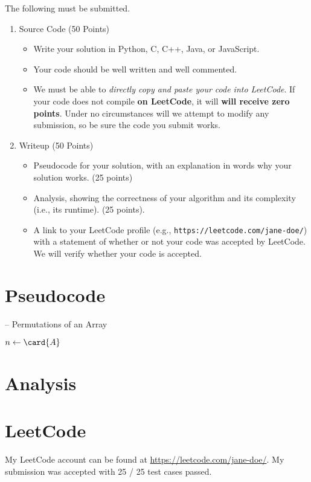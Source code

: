 \documentclass[draft]{article}
\begin{document}
\begin{titlepage}
    The following must be submitted.
    \begin{enumerate}[label=\textbf{(\alph*)}]
        \item Source Code (50 Points)
              \begin{itemize}
                  \item Write your solution in Python, C, C++, Java, or JavaScript.
                  \item Your code should be well written and well commented.
                  \item We must be able to \emph{directly copy and paste your code into LeetCode}. If your code does not compile \textbf{on LeetCode}, it will \textbf{will receive zero points}. Under no circumstances will we attempt to modify any submission, so be sure the code you submit works.
              \end{itemize}
        \item Writeup (50 Points)
              \begin{itemize}
                  \item Pseudocode for your solution, with an explanation in words why your solution works. (25 points)
                  \item Analysis, showing the correctness of your algorithm and its  complexity (i.e., its runtime). (25 points).
                  \item A link to your LeetCode profile (e.g., \texttt{https://leetcode.com/jane-doe/}) with a statement of whether or not your code was accepted by LeetCode. We will verify whether your code is accepted.
              \end{itemize}
    \end{enumerate}
\end{titlepage}

\section{Pseudocode}
\begin{algorithm}[H]
    \caption[]{ -- Permutations of an Array }
    \label{alg:permutations}
    \begin{algorithmic}[1]
        \State $n\gets\card{A}$
        \Else {}
        \EndIf
        \EndFunction
    \end{algorithmic}
\end{algorithm}
\section{Analysis}

\section{LeetCode}
My LeetCode account can be found at \url{https://leetcode.com/jane-doe/}. My submission was accepted with 25 / 25 test cases passed.
\end{document}
